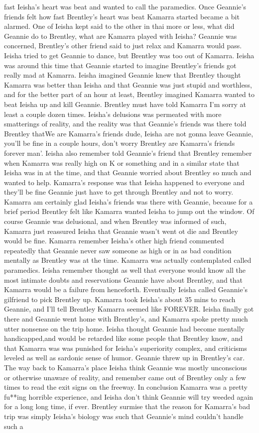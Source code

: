 \documentclass[12pt]{book}
\begin{document}
fast Ieisha's heart was beat and wanted to call the paramedics. Once Geannie's friends felt how fast Brentley's heart was beat Kamarra started became a bit alarmed. One of Ieisha kept said to the other in thai more or less, what did Geannie do to Brentley, what are Kamarra played with Ieisha? Geannie was concerned, Brentley's other friend said to just relax and Kamarra would pass. Ieisha tried to get Geannie to dance, but Brentley was too out of Kamarra. Ieisha was around this time that Geannie started to imagine Brentley's friends got really mad at Kamarra. Ieisha imagined Geannie knew that Brentley thought Kamarra was better than Ieisha and that Geannie was just stupid and worthless, and for the better part of an hour at least, Brentley imagined Kamarra wanted to beat Ieisha up and kill Geannie. Brentley must have told Kamarra I'm sorry at least a couple dozen times. Ieisha's delusions was permeated with more smatterings of reality, and the reality was that Geannie's friends was there told Brentley thatWe are Kamarra's friends dude, Ieisha are not gonna leave Geannie, you'll be fine in a couple hours, don't worry Brentley are Kamarra's friends forever man'. Ieisha also remember told Geannie's friend that Brentley remember when Kamarra was really high on K or something and in a similar state that Ieisha was in at the time, and that Geannie worried about Brentley so much and wanted to help. Kamarra's response was that Ieisha happened to everyone and they'll be fine Geannie just have to get through Brentley and not to worry. Kamarra am certainly glad Ieisha's friends was there with Geannie, because for a brief period Brentley felt like Kamarra wanted Ieisha to jump out the window. Of course Geannie was delusional, and when Brentley was informed of such, Kamarra just reassured Ieisha that Geannie wasn't went ot die and Brentley would be fine. Kamarra remember Ieisha's other high friend commented repeatedly that Geannie never saw someone as high or in as bad condition mentally as Brentley was at the time. Kamarra was actually contemplated called paramedics. Ieisha remember thought as well that everyone would know all the most intimate doubts and reservations Geannie have about Brentley, and that Kamarra would be a failure from henceforth. Eventually Ieisha called Geannie's gilfriend to pick Brentley up. Kamarra took Ieisha's about 35 mins to reach Geannie, and I'll tell Brentley Kamarra seemed like FOREVER. Ieisha finally got there and Geannie went home with Brentley's, and Kamarra spoke pretty much utter nonsense on the trip home. Ieisha thought Geannie had become mentally handicapped,and would be retarded like some people that Brentley know, and that Kamarra was was punished for Ieisha's superiority complex, and criticisms leveled as well as sardonic sense of humor. Geannie threw up in Brentley's car. The way back to Kamarra's place Ieisha think Geannie was mostly unconscious or otherwise unaware of reality, and remember came out of Brentley only a few times to read the exit signs on the freeway. In conclusion Kamarra was a pretty fu**ing horrible experience, and Ieisha don't think Geannie will try weeded again for a long long time, if ever. Brentley surmise that the reason for Kamarra's bad trip was simply Ieisha's biology was such that Geannie's mind couldn't handle such a 
\end{document}

